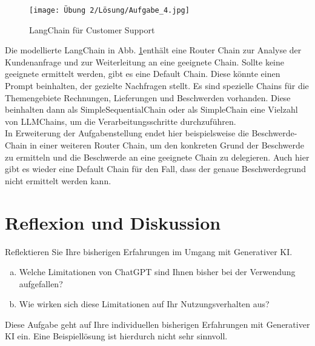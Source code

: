 \documentclass[12pt,ngerman]{AssignmentClass}
\begin{document}
        \begin{figure}
            \centering
            \texttt{[image: Übung 2/Lösung/Aufgabe\_4.jpg]}
            \caption{LangChain für Customer Support}
            \label{fig:LangChain}
        \end{figure}

        Die modellierte LangChain in Abb. \ref{fig:LangChain}enthält eine Router Chain zur Analyse der Kundenanfrage und zur Weiterleitung an eine geeignete Chain. Sollte keine geeignete ermittelt werden, gibt es eine Default Chain. Diese könnte einen Prompt beinhalten, der gezielte Nachfragen stellt. Es sind spezielle Chains für die Themengebiete Rechnungen, Lieferungen und Beschwerden vorhanden. Diese beinhalten dann als SimpleSequentialChain oder als SimpleChain eine Vielzahl von LLMChains, um die Verarbeitungsschritte durchzuführen.\\

        In Erweiterung der Aufgabenstellung endet hier beispielsweise die Beschwerde-Chain in einer weiteren Router Chain, um den konkreten Grund der Beschwerde zu ermitteln und die Beschwerde an eine geeignete Chain zu delegieren. Auch hier gibt es wieder eine Default Chain für den Fall, dass der genaue Beschwerdegrund nicht ermittelt werden kann.

    
    \section{Reflexion und Diskussion}
        Reflektieren Sie Ihre bisherigen Erfahrungen im Umgang mit Generativer KI.
        \begin{enumerate}[a)]
            \item Welche Limitationen von ChatGPT sind Ihnen bisher bei der Verwendung aufgefallen?
            \item Wie wirken sich diese Limitationen auf Ihr Nutzungsverhalten aus?
        \end{enumerate}

        \noindent Diese Aufgabe geht auf Ihre individuellen bisherigen Erfahrungen mit Generativer KI ein. Eine Beispiellösung ist hierdurch nicht sehr sinnvoll.
\end{document}
